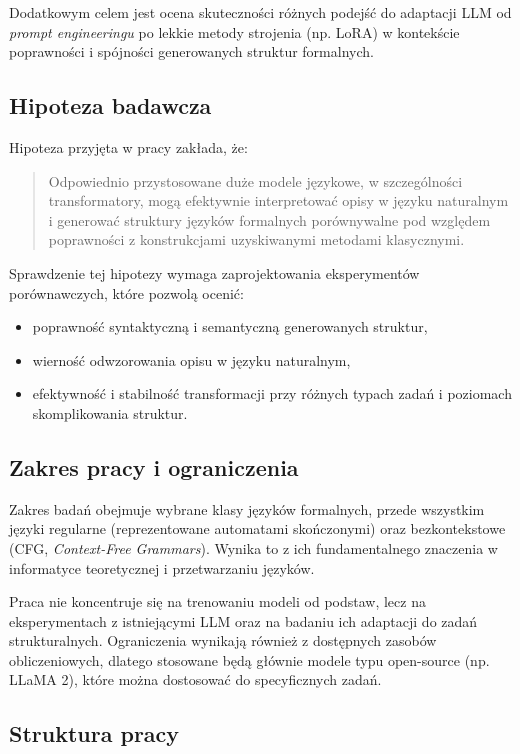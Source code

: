 \documentclass[12pt]{article}
\begin{document}
Dodatkowym celem jest ocena skuteczności różnych podejść do adaptacji LLM od \textit{prompt engineeringu} po lekkie metody strojenia (np. LoRA) w kontekście poprawności i spójności generowanych struktur formalnych.

\subsection{Hipoteza badawcza}

Hipoteza przyjęta w pracy zakłada, że:

\begin{quote}
Odpowiednio przystosowane duże modele językowe, w szczególności transformatory, mogą efektywnie interpretować opisy w języku naturalnym i generować struktury języków formalnych porównywalne pod względem poprawności z konstrukcjami uzyskiwanymi metodami klasycznymi.
\end{quote}

Sprawdzenie tej hipotezy wymaga zaprojektowania eksperymentów porównawczych, które pozwolą ocenić:

\begin{itemize}
    \item poprawność syntaktyczną i semantyczną generowanych struktur,
    \item wierność odwzorowania opisu w języku naturalnym,
    \item efektywność i stabilność transformacji przy różnych typach zadań i poziomach skomplikowania struktur.
\end{itemize}

\subsection{Zakres pracy i ograniczenia}

Zakres badań obejmuje wybrane klasy języków formalnych, przede wszystkim języki regularne (reprezentowane automatami skończonymi) oraz bezkontekstowe (CFG, \textit{Context-Free Grammars}). Wynika to z ich fundamentalnego znaczenia w informatyce teoretycznej i przetwarzaniu języków.

Praca nie koncentruje się na trenowaniu modeli od podstaw, lecz na eksperymentach z istniejącymi LLM oraz na badaniu ich adaptacji do zadań strukturalnych. Ograniczenia wynikają również z dostępnych zasobów obliczeniowych, dlatego stosowane będą głównie modele typu open-source (np. LLaMA 2), które można dostosować do specyficznych zadań.

\subsection{Struktura pracy}
\end{document}
